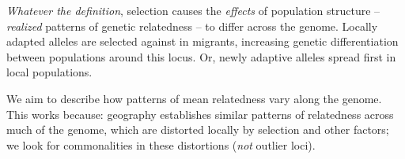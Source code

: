 \documentclass[fontscale=0.38,a0paper]{baposter}
\begin{document}
\begin{poster}
{\emph{Whatever the definition},
selection causes the \emph{effects} of population structure --
\emph{realized} patterns of genetic relatedness --
to differ across the genome.
Locally adapted alleles are selected against in migrants,
increasing genetic differentiation between populations around this locus.
Or, newly adaptive alleles spread first in local populations.

We aim to describe 
how patterns of mean relatedness vary along the genome.
This works because:
geography establishes similar patterns of relatedness across much of the genome,
which are distorted locally by selection and other factors;
we look for commonalities in these distortions (\emph{not} outlier loci).


}


\end{poster}
\end{document}
